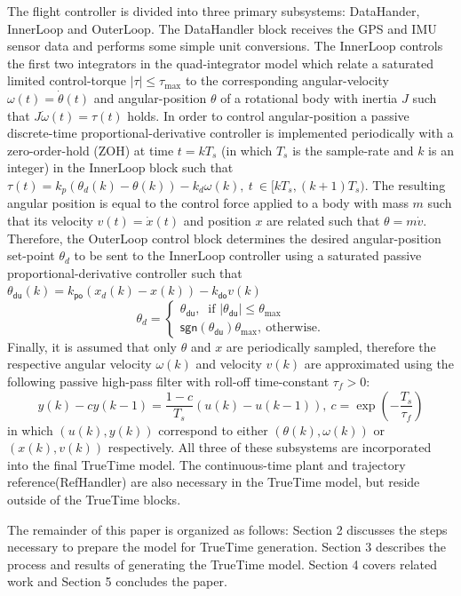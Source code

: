 The flight controller is divided into three primary subsystems:
DataHander, InnerLoop and OuterLoop.  The DataHandler block receives
the GPS and IMU sensor data and performs some simple unit conversions.
The InnerLoop controls the first two integrators in the
quad-integrator model which relate a saturated limited control-torque
$|\tau| \leq \tau_{\max}$ to the corresponding 
angular-velocity $\omega(t)=\dot{\theta}(t)$ and angular-position
$\theta$ of a rotational body with inertia $J$ such that
$J\dot{\omega}(t)=\tau(t)$ holds.  In order to control angular-position a
passive discrete-time proportional-derivative controller is
implemented periodically with a zero-order-hold (ZOH) at time $t=kT_s$ 
(in which $T_s$ is the sample-rate and $k$ is an integer) in the 
InnerLoop block such that $\tau(t) = k_p (\theta_d(k) - \theta(k)) - k_d 
\omega(k),\ t\ \in [kT_s,(k+1)T_s)$.  The resulting angular position
is equal to the control force applied to a body with mass $m$ such
that its velocity $v(t)=\dot{x}(t)$ and position $x$ are related such that
$\theta = m \dot{v}$.  Therefore, the OuterLoop control block 
determines the desired angular-position set-point $\theta_d$ to be
sent to the InnerLoop controller using a saturated passive
proportional-derivative controller such that
$\theta_{\mathsf{du}}(k)=k_{\mathsf{po}}(x_d(k)-x(k))
-k_{\mathsf{do}}v(k)$
\begin{equation*}
 \theta_d = \begin{cases}
\theta_{\mathsf{du}},\ \text{ if } |\theta_{\mathsf{du}}| \leq
\theta_{\max}\\
\mathsf{sgn}(\theta_{\mathsf{du}})\theta_{\max},\ \text{otherwise.}
\end{cases}
\end{equation*}
Finally, it is assumed that only $\theta$ and $x$ are periodically
sampled, therefore the respective angular velocity $\omega(k)$ and
velocity $v(k)$ are approximated using the following passive high-pass
filter with roll-off time-constant $\tau_f > 0$:
\begin{equation*}
y(k)-c y(k-1) = \frac{1-c}{T_s}(u(k)-u(k-1)),\ c=\exp(-\frac{T_s}{\tau_f})
\end{equation*}
in which $(u(k),y(k))$ correspond to either $(\theta(k),\omega(k))$ or
$(x(k),v(k))$ respectively.  All three of these subsystems are
incorporated into the final TrueTime model.  The continuous-time plant
and trajectory reference(RefHandler) are also necessary in the
TrueTime model, but reside outside of the  TrueTime blocks.

The remainder of this paper is organized as follows: Section 2 discusses the steps necessary to prepare the model for TrueTime generation.  Section 3 describes the process and results of generating the TrueTime model.  Section 4 covers related work and Section 5 concludes the paper.